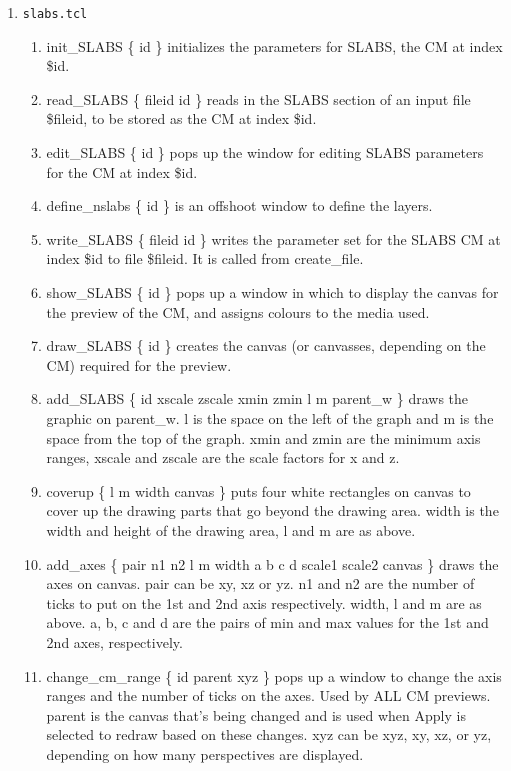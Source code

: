 \documentclass[12pt]{book}
\begin{document}
\begin{enumerate}
\item {\tt slabs.tcl}
\begin{enumerate}
\item {\sf init\_SLABS \{ id \}} initializes the parameters for SLABS, the CM
at index \$id.
\item {\sf read\_SLABS \{ fileid id \}} reads in the SLABS section of an input
file \$fileid, to be stored as the CM at index \$id.
\item {\sf edit\_SLABS \{ id \}} pops up the window for editing SLABS
parameters for the CM at index \$id.
\item {\sf define\_nslabs \{ id \}} is an offshoot window to define the layers.
\item {\sf write\_SLABS \{ fileid id \}} writes the parameter set for the SLABS
CM at index \$id to file \$fileid.  It is called from {\sf create\_file}.
\item {\sf show\_SLABS \{ id \}} pops up a window in which to display
the canvas for the preview of the CM, and assigns colours to the media
used.
\item {\sf draw\_SLABS \{ id \}} creates the canvas (or canvasses,
depending on the CM) required for the preview.
\item {\sf add\_SLABS \{ id xscale zscale xmin zmin l m parent\_w \}}
draws the graphic on parent\_w.  l is the space on the left of the graph
and m is the space from the top of the graph.  xmin and zmin are the
minimum axis ranges, xscale and zscale are the scale factors for x and
z.
\item {\sf coverup \{ l m width canvas \}} puts four white rectangles on
canvas to cover up the drawing parts that go beyond the drawing area.
width is the width and height of the drawing area, l and m are as above.
\item {\sf add\_axes \{ pair n1 n2 l m width a b c d scale1 scale2
canvas \}} draws the axes on canvas.  pair can be xy, xz or yz.  n1 and
n2 are the number of ticks to put on the 1st and 2nd axis respectively.
width, l and m are as above.  a, b, c and d are the pairs of min and max
values for the 1st and 2nd axes, respectively.
\item {\sf change\_cm\_range \{ id parent xyz \}} pops up a window to change the
axis ranges and the number of ticks on the axes.  Used by ALL CM
previews.  parent is the canvas that's being changed and is used when
Apply is selected to redraw based on these changes.  xyz can be xyz, xy,
xz, or yz, depending on how many perspectives are displayed.
\end{enumerate}


\end{enumerate}
\end{document}

